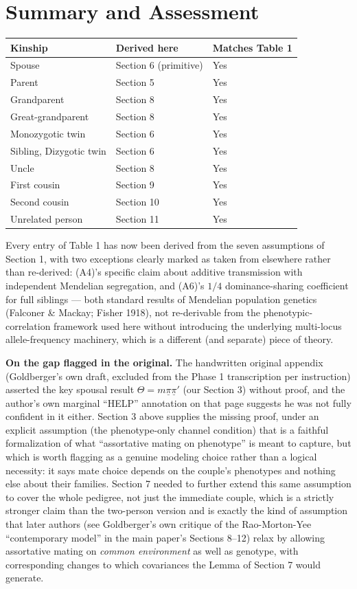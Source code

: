 \documentclass[12pt]{article}
\begin{document}
\section{Summary and Assessment}

\begin{center}
\begin{tabular}{l l l}
\hline
Kinship & Derived here & Matches Table 1 \\
\hline
Spouse & Section 6 (primitive) & Yes \\
Parent & Section 5 & Yes \\
Grandparent & Section 8 & Yes \\
Great-grandparent & Section 8 & Yes \\
Monozygotic twin & Section 6 & Yes \\
Sibling, Dizygotic twin & Section 6 & Yes \\
Uncle & Section 8 & Yes \\
First cousin & Section 9 & Yes \\
Second cousin & Section 10 & Yes \\
Unrelated person & Section 11 & Yes \\
\hline
\end{tabular}
\end{center}

Every entry of Table 1 has now been derived from the seven assumptions of Section 1, with two exceptions clearly marked as taken from elsewhere rather than re-derived: (A4)'s specific claim about additive transmission with independent Mendelian segregation, and (A6)'s $1/4$ dominance-sharing coefficient for full siblings — both standard results of Mendelian population genetics (Falconer \& Mackay; Fisher 1918), not re-derivable from the phenotypic-correlation framework used here without introducing the underlying multi-locus allele-frequency machinery, which is a different (and separate) piece of theory.

\textbf{On the gap flagged in the original.} The handwritten original appendix (Goldberger's own draft, excluded from the Phase 1 transcription per instruction) asserted the key spousal result $\Theta=m\underline\pi\underline\pi'$ (our Section 3) without proof, and the author's own marginal ``HELP'' annotation on that page suggests he was not fully confident in it either. Section 3 above supplies the missing proof, under an explicit assumption (the phenotype-only channel condition) that is a faithful formalization of what ``assortative mating on phenotype'' is meant to capture, but which is worth flagging as a genuine modeling choice rather than a logical necessity: it says mate choice depends on the couple's phenotypes and nothing else about their families. Section 7 needed to further extend this same assumption to cover the whole pedigree, not just the immediate couple, which is a strictly stronger claim than the two-person version and is exactly the kind of assumption that later authors (see Goldberger's own critique of the Rao-Morton-Yee ``contemporary model'' in the main paper's Sections 8--12) relax by allowing assortative mating on \emph{common environment} as well as genotype, with corresponding changes to which covariances the Lemma of Section 7 would generate.
\end{document}
